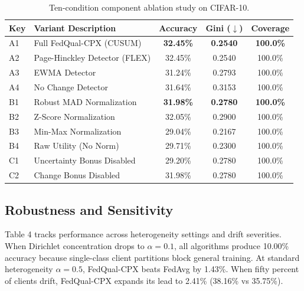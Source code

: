 \documentclass[conference]{IEEEtran}
\begin{document}
\begin{table}[h]
\caption{Ten-condition component ablation study on CIFAR-10.}
\label{tab:ablation}
\centering
\begin{tabular}{llccc}
\toprule
\textbf{Key} & \textbf{Variant Description} & \textbf{Accuracy} & \textbf{Gini ($\downarrow$)} & \textbf{Coverage} \\
\midrule
A1 & Full FedQual-CPX (CUSUM) & \textbf{32.45\%} & \textbf{0.2540} & \textbf{100.0\%} \\
A2 & Page-Hinckley Detector (FLEX) & 32.45\% & 0.2540 & 100.0\% \\
A3 & EWMA Detector & 31.24\% & 0.2793 & 100.0\% \\
A4 & No Change Detector & 31.64\% & 0.3153 & 100.0\% \\
\midrule
B1 & Robust MAD Normalization & \textbf{31.98\%} & \textbf{0.2780} & \textbf{100.0\%} \\
B2 & Z-Score Normalization & 32.05\% & 0.2900 & 100.0\% \\
B3 & Min-Max Normalization & 29.04\% & 0.2167 & 100.0\% \\
B4 & Raw Utility (No Norm) & 29.71\% & 0.2300 & 100.0\% \\
\midrule
C1 & Uncertainty Bonus Disabled & 29.20\% & 0.2780 & 100.0\% \\
C2 & Change Bonus Disabled & 31.98\% & 0.2780 & 100.0\% \\
\bottomrule
\end{tabular}
\end{table}

\subsection{Robustness and Sensitivity}
Table 4 tracks performance across heterogeneity settings and drift severities. When Dirichlet concentration drops to $\alpha = 0.1$, all algorithms produce 10.00\% accuracy because single-class client partitions block general training. At standard heterogeneity $\alpha = 0.5$, FedQual-CPX beats FedAvg by 1.43\%. When fifty percent of clients drift, FedQual-CPX expands its lead to 2.41\% (38.16\% vs 35.75\%).
\end{document}
